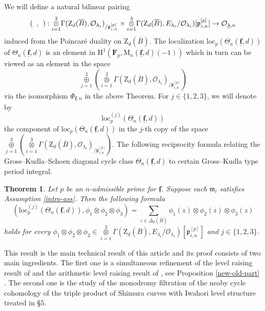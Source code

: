 \documentclass[10pt]{amsart}
\numberwithin{equation}{section}
\theoremstyle{plain}
\numberwithin{equation}{section}
\newtheorem{thm}{Theorem}
\theoremstyle{definition}
\theoremstyle{remark}
\def\loc{\mathrm{loc}}
\def\frakm{\mathfrak{m}}
\def\undlamb{\underline{\lambda}}
\def\triplef{\underline{\mathbf{f}}}
\def\threetensor{\overset{3}{\underset{i=1}\otimes}}
\def\threesum{\overset{3}{\underset{j=1}\oplus} }
\def\calO{\mathcal{O}}
\def\frakm{\mathfrak{m}}
\def\frakp{\mathfrak{p}}
\def\FF{\mathbf{F}}
\def\rmH{\mathrm{H}}
\def\rmM{\mathrm{M}}
\def\rmZ{\mathrm{Z}}
\begin{document}
We will define a natural bilinear pairing 
\begin{equation*}
 (\hphantom{a}, \hphantom{b}): \threetensor\Gamma(\rmZ_{d}(\overline{B}), \calO_{\lambda_{i}})_{/\frakp^{[p]}_{i, n}}\times  \threetensor\Gamma(\rmZ_{d}(\overline{B}), E_{\lambda_{i}}/\calO_{\lambda_{i}})[\frakp^{[p]}_{i, n}]\rightarrow \calO_{\undlamb, n}
\end{equation*}
induced from the Poincar\'e duality on $\rmZ_{d}(\overline{B})$. The localization $\loc_{p}(\Theta_{n}(\triplef, d))$ of $\Theta_{n}(\triplef, d)$ is an element in $\rmH^{1}(\FF_{p},  \rmM_{n}(\triplef,d)(-1))$ which in turn can be viewed as an element in the space 
\begin{equation*}
\threesum(\threetensor\Gamma(\rmZ_{d}(\overline{B}), \calO_{{\lambda_{i}}})_{/\frakp^{[p]}_{i, n}})
\end{equation*}
via the isomorphism $\Phi_{\triplef, n}$ in the above Theorem. For $j\in\{1, 2, 3\}$, we will denote by 
$$\loc^{(j)}_{p}(\Theta_{n}(\triplef,d))$$ 
the component of $\loc_{p}(\Theta_{n}(\triplef, d))$ in the $j$-th copy of the space 
$\threesum(\threetensor\Gamma(\rmZ_{d}(\overline{B}), \calO_{{\lambda_{i}}})_{/\frakp^{[p]}_{i, n}})$. The following  reciprocity formula relating the Gross--Kudla--Schoen diagonal cycle class $\Theta_{n}(\triplef, d)$ to certain {Gross--Kudla type period integral}. 
\begin{thm}\label{unram-intro}
Let $p$ be an $n$-admissible prime for $\triplef$. Suppose each $\frakm_{i}$ satisfies Assumption \ref{intro-ass}. Then the following formula
\begin{equation*}
(\loc^{(j)}_{p}(\Theta_{n}(\triplef,d)), \phi_{1}\otimes\phi_{2}\otimes\phi_{3})=\sum_{z\in \Delta_{d}(\overline{B})} \phi_{1}(z)\otimes \phi_{2}(z)\otimes \phi_{3}(z)
\end{equation*}
holds for every $\phi_{1}\otimes \phi_{2}\otimes \phi_{2}\in \threetensor\Gamma(\rmZ_{d}(\overline{B}), E_{\lambda_{i}}/\calO_{{\lambda_{i}}})[\frakp^{[p]}_{i, n}]$ and $j\in\{1, 2, 3\}$. 
\end{thm}
This result is the main technical result of this article and its proof consists of  two main ingredients. The first one is a simultaneous refinement of the level raising result of \cite{Ri-ICM} and the arithmetic level raising result of \cite{BD}, see Proposition \ref{new-old-part} . The second one is the study of the monodromy filtration of the neaby cycle cohomology of the triple product of Shimura curves with Iwahori level structure treated in \S $5$.
\end{document}
